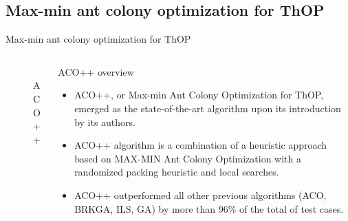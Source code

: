 \documentclass[aspectratio=169]{beamer}
\begin{document}
\subsection{Max-min ant colony optimization for ThOP}
\begin{frame}{Max-min ant colony optimization for ThOP}
    \begin{columns}
        \begin{column}{0.3\textwidth}
            \begin{center}
                \begin{figure}[htbp]
                    \centering
                      \\
                    \vspace{0.4cm}
                    \tiny ACO++
                \end{figure}
            \end{center}
        \end{column}
        \begin{column}{0.5\textwidth}
            \begin{block}{ACO++ overview}
                \footnotesize
                \begin{itemize}
                    \justifying
                    \vspace{0.1cm}
                    \item ACO++, or Max-min Ant Colony Optimization for ThOP, emerged as the state-of-the-art algorithm upon its introduction by its authors.
                          \vspace{0.1cm}
                    \item ACO++ algorithm is a combination of a heuristic approach based on MAX-MIN Ant Colony Optimization with a randomized packing heuristic and local searches.
                          \vspace{0.1cm}
                    \item ACO++ outperformed all other previous algorithms (ACO, BRKGA, ILS, GA) by more than 96\% of the total of test cases.
                          \vspace{0.1cm}
                \end{itemize}
            \end{block}
        \end{column}
    \end{columns}
\end{frame}
\end{document}
